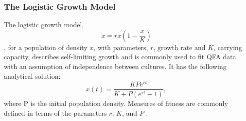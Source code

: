 \begin{multicols}{2}
\subsubsection{The Logistic Growth Model}
\label{sec:logistic_model}
The logistic growth model,
\begin{equation}
  \label{eq:1}
  \dot{x} = rx\left(1 - \frac{x}{K}\right)
\end{equation}
\citep{Verhulst1845}, for a population of density \(x\), with parameters, \(r\), growth
rate and \(K\), carrying capacity, describes self-limiting growth and is commonly used
to fit QFA data with an assumption of independence between cultures. It has the
following analytical solution:
\begin{equation}
  \label{eq:2}
  x(t) = \frac{KPe^{rt}}{K + P(e^{rt}-1)},
\end{equation}
where P is the initial population density. Measures of fitness are commonly defined in
terms of the parameters \(r\), \(K\), and \(P\) \citep{Addinall2011}.


\end{multicols}
